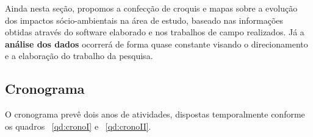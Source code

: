 Ainda nesta seção, propomos a confecção de croquis e mapas sobre a evolução dos impactos sócio-ambientais na área de estudo, baseado nas informações obtidas através do software elaborado e nos trabalhos de campo realizados. Já a \textbf{análise dos dados} ocorrerá de forma quase constante visando o direcionamento e a elaboração do trabalho da pesquisa. 

\subsection{Cronograma}

O cronograma prevê dois anos de atividades, dispostas temporalmente conforme os quadros ~\ref{qd:cronoI} e ~\ref{qd:cronoII}.



